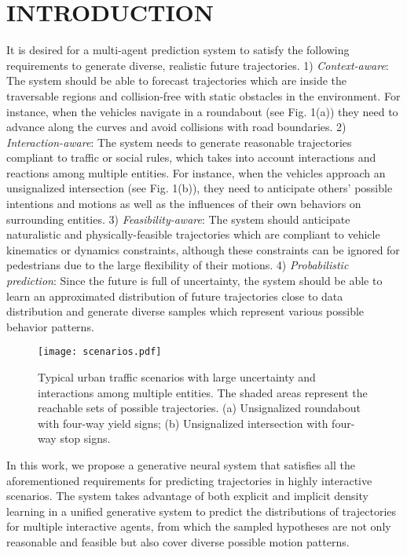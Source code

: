 \documentclass[letterpaper, 10 pt, conference]{ieeeconf}
\begin{document}
\section{INTRODUCTION}
It is desired for a multi-agent prediction system to satisfy the following requirements to generate diverse, realistic future trajectories.
1) \textit{Context-aware}: The system should be able to forecast trajectories which are inside the traversable regions and collision-free with static obstacles in the environment. For instance, when the vehicles navigate in a roundabout (see Fig. 1(a)) they need to advance along the curves and avoid collisions with road boundaries.
2) \textit{Interaction-aware}: The system needs to generate reasonable trajectories compliant to traffic or social rules, which takes into account interactions and reactions among multiple entities. For instance, when the vehicles approach an unsignalized intersection (see Fig. 1(b)), they need to anticipate others' possible intentions and motions as well as the influences of their own behaviors on surrounding entities.
3) \textit{Feasibility-aware}: The system should anticipate naturalistic and physically-feasible trajectories which are compliant to vehicle kinematics or dynamics constraints, although these constraints can be ignored for pedestrians due to the large flexibility of their motions.
4) \textit{Probabilistic prediction}: Since the future is full of uncertainty, the system should be able to learn an approximated distribution of future trajectories close to data distribution and generate diverse samples which represent various possible behavior patterns.
\begin{figure}[!tbp]
	\centering
	\texttt{[image: scenarios.pdf]}
	\caption{Typical urban traffic scenarios with large uncertainty and interactions among multiple entities. The shaded areas represent the reachable sets of possible trajectories. (a) Unsignalized roundabout with four-way yield signs; (b) Unsignalized intersection with four-way stop signs.}
\end{figure}

In this work, we propose a generative neural system that satisfies all the aforementioned requirements for predicting trajectories in highly interactive scenarios. The system takes advantage of both explicit and implicit density learning in a unified generative system to predict the distributions of trajectories for multiple interactive agents, from which the sampled hypotheses are not only reasonable and feasible but also cover diverse possible motion patterns.
\end{document}
